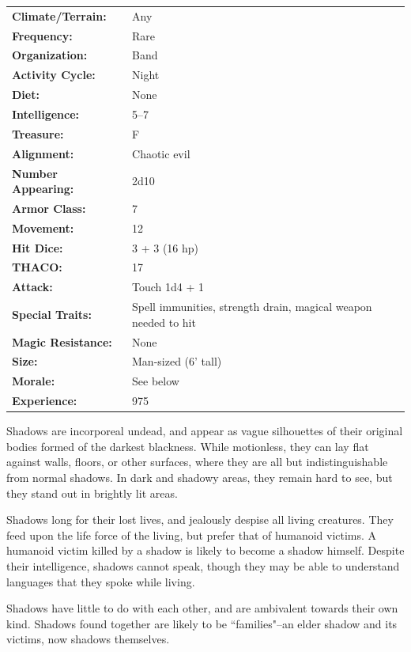 \begin{multicols}{2}
\begin{minipage}{\columnwidth}
\noindent \begin{tabular}{p{}p{}}
\textbf{Climate/Terrain:}	& Any	\\
\textbf{Frequency:} 		& Rare	\\
\textbf{Organization:} 		& Band	\\
\textbf{Activity Cycle:} 	& Night	\\
\textbf{Diet:} 				& None	\\
\textbf{Intelligence:} 		& 5--7	\\
\textbf{Treasure:} 			& F	\\
\textbf{Alignment:} 		& Chaotic evil	\\
\hline
\textbf{Number Appearing:} 	& 2d10	\\
\textbf{Armor Class:} 		& 7	\\
\textbf{Movement:} 			& 12	\\
\textbf{Hit Dice:} 			& 3 + 3 (16 hp)	\\
\textbf{THACO:} 			& 17	\\
\textbf{Attack:} 			& Touch 1d4 + 1	\\
\textbf{Special Traits:} & Spell immunities, strength drain, magical weapon needed to hit	\\
\textbf{Magic Resistance:} 	& None	\\
\textbf{Size:} 				& Man-sized (6' tall)	\\
\textbf{Morale:} 			& See below	\\
\textbf{Experience:} 		& 975	\\ %
\end{tabular}

\end{minipage}

Shadows are incorporeal undead, and appear as vague silhouettes of their original bodies formed of the darkest blackness. While motionless, they can lay flat against walls, floors, or other surfaces, where they are all but indistinguishable from normal shadows. In dark and shadowy areas, they remain hard to see, but they stand out in brightly lit areas.

Shadows long for their lost lives, and jealously despise all living creatures. They feed upon the life force of the living, but prefer that of humanoid victims. A humanoid victim killed by a shadow is likely to become a shadow himself. Despite their intelligence, shadows cannot speak, though they may be able to understand languages that they spoke while living.

Shadows have little to do with each other, and are ambivalent towards their own kind. Shadows found together are likely to be ``families"--an elder shadow and its victims, now shadows themselves.


\end{multicols}
